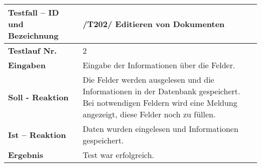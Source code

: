 \begin{longtable}{|p{5cm}|p{10cm}|}
\hline
\textbf{Testfall -- ID und Bezeichnung} & \textnormal{/T202/ Editieren von
Dokumenten} \\
\hline
\textbf{Testlauf Nr.} & \textnormal{2} \\
\hline
\textbf{Eingaben} & \textnormal{
Eingabe der Informationen über die Felder.} \\
\hline
\textbf{Soll - Reaktion} & \textnormal{
Die Felder werden ausgelesen und die Informationen in der Datenbank gespeichert.
Bei notwendigen Feldern wird eine Meldung angezeigt, diese Felder noch zu
füllen.
} \\
\hline
\textbf{Ist -- Reaktion} & \textnormal{Daten wurden eingelesen und Informationen 
gespeichert.} \\
\hline
\textbf{Ergebnis} & \textnormal{Test war erfolgreich.} \\
\end{longtable}

